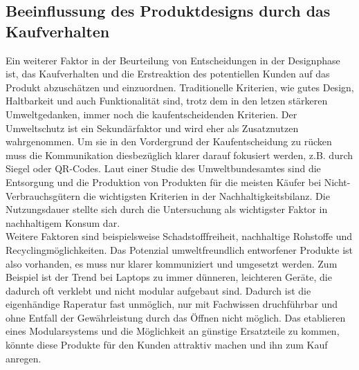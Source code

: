 \documentclass[13pt,titlepage]{article}
\begin{document}
\subsection {Beeinflussung des Produktdesigns durch das Kaufverhalten}
	Ein weiterer Faktor in der Beurteilung von Entscheidungen in der Designphase ist, das Kaufverhalten und die Erstreaktion des potentiellen Kunden auf das Produkt abzusch\"atzen und einzuordnen.
Traditionelle Kriterien, wie gutes Design, Haltbarkeit und auch Funktionalit\"at sind, trotz dem in den letzen st\"arkeren Umweltgedanken, immer noch die kaufentscheidenden Kriterien. 
Der Umweltschutz ist ein Sekund\"arfaktor und wird eher als Zusatznutzen wahrgenommen.
Um sie in den Vordergrund der Kaufentscheidung zu r\"ucken muss die Kommunikation diesbez\"uglich klarer darauf fokusiert werden, z.B. durch Siegel oder QR-Codes.
Laut einer Studie des Umweltbundesamtes sind die Entsorgung und die Produktion von Produkten für die meisten K\"aufer bei Nicht-Verbrauchsg\"utern die wichtigsten Kriterien in der Nachhaltigkeitsbilanz. 
Die Nutzungsdauer stellte sich durch die Untersuchung als wichtigster Faktor in nachhaltigem Konsum dar.\protect\footnotemark{}\\ 
Weitere Faktoren sind beispielsweise Schadstofffreiheit, nachhaltige Rohstoffe und Recyclingm\"oglichkeiten. 
Das Potenzial umweltfreundlich entworfener Produkte ist also vorhanden, es muss nur klarer kommuniziert und umgesetzt werden.
Zum Beispiel ist der Trend bei Laptops zu immer d\"unneren, leichteren Ger\"ate, die dadurch oft verklebt und nicht modular aufgebaut sind. 
Dadurch ist die eigenh\"andige Raperatur fast unm\"oglich, nur mit Fachwissen druchf\"uhrbar und ohne Entfall der Gew\"ahrleistung durch das \"Offnen nicht m\"oglich.
Das etablieren eines Modularsystems und die M\"oglichkeit an g\"unstige Ersatzteile zu kommen, k\"onnte diese Produkte f\"ur den Kunden attraktiv machen und ihn zum Kauf anregen.
\end{document}
